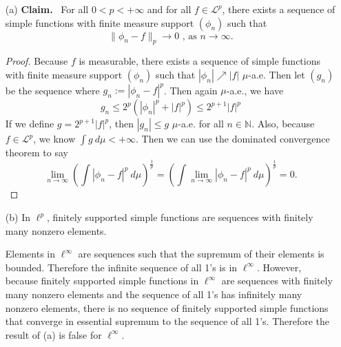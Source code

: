 \documentclass[12pt]{article}
\newcommand{\N}{\mathbb{N}}
\newcommand{\eq}[1]{\begin{equation*}#1\end{equation*}}
\begin{document}
\begin{itemize}
    \item [(a)] \textbf{Claim.}~ For all $0 < p < + \infty$ and for all $f \in \mathcal{L}^p$, there exists a sequence of simple functions with finite measure support $(\phi_n)$ such that 
    \eq{\|\phi_n - f\|_p \to 0 \text{ , as } n \to \infty.}

    \begin{proof}
        Because $f$ is measurable, there exists a sequence of simple functions with finite measure support $(\phi_n)$ such that $|\phi_n| \nearrow |f|$ $\mu$-a.e. Then let $(g_n)$ be the sequence where $g_n := |\phi_n - f|^p$. Then again $\mu$-a.e., we have
        \eq{g_n \leq 2^p(|\phi_n|^p + |f|^p) \leq 2^{p+1}|f|^p}
        If we define $g = 2^{p+1}|f|^p$, then $|g_n| \leq g$ $\mu$-a.e. for all $n \in \N$. Also, because $f \in \mathcal{L}^p$, we know $\int g ~d \mu < +\infty$. Then we can use the dominated convergence theorem to say
        \eq{\lim_{n \to \infty} \left( \int |\phi_n - f|^p ~d \mu\right)^\frac{1}{p} = \left( \int \lim_{n \to \infty} |\phi_n - f|^p ~d \mu\right)^\frac{1}{p} = 0.}
    \end{proof}

    \item [(b)] In $\ell^p$, finitely supported simple functions are sequences with finitely many nonzero elements.
    
    Elements in $\ell^\infty$ are sequences such that the supremum of their elements is bounded. Therefore the infinite sequence of all 1's is in $\ell^\infty$. However, because finitely supported simple functions in $\ell^\infty$ are sequences with finitely many nonzero elements and the sequence of all 1's has infinitely many nonzero elements, there is no sequence of finitely supported simple functions that converge in essential supremum to the sequence of all 1's. Therefore the result of (a) is false for $\ell^\infty$.
\end{itemize}
\end{document}
